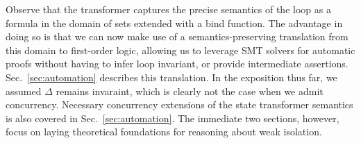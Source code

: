 Observe that the transformer captures the precise semantics of the
loop as a formula in the domain of sets extended with a bind
function. The advantage in doing so is that we can now make use of a
semantics-preserving translation from this domain to first-order
logic, allowing us to leverage SMT solvers for automatic proofs
without having to infer loop invariant, or provide intermediate
assertions.  Sec.~\ref{sec:automation} describes this translation. In
the exposition thus far, we assumed $\Delta$ remains invaraint, which
is clearly not the case when we admit concurrency.  Necessary
concurrency extensions of the state transformer semantics is also
covered in Sec.~\ref{sec:automation}.  The immediate two sections,
however, focus on laying theoretical foundations for reasoning about
weak isolation.
